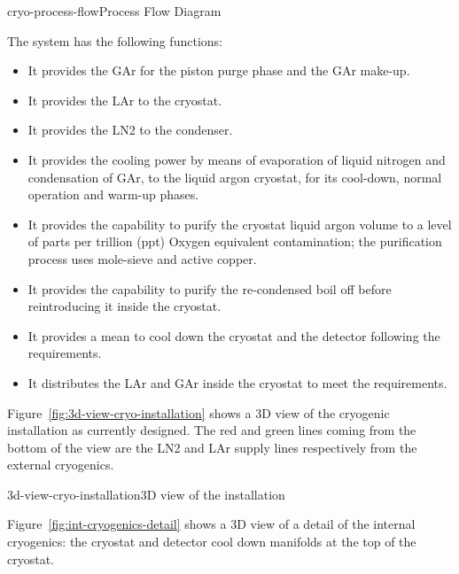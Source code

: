 \begin{cdrfigure}{cryo-process-flow}{Process Flow Diagram} 
\end{cdrfigure}

The system has the following functions:

\begin{itemize}
\item It provides the GAr for the piston purge phase and the GAr make-up.
\item  It provides the LAr to the cryostat.
\item  It provides the LN2 to the condenser.
\item  It provides the cooling power by means of evaporation of liquid nitrogen and condensation of GAr, to the liquid argon cryostat, for its cool-down, normal operation and warm-up phases.
\item  It provides the capability to purify the cryostat liquid argon volume to a level of parts per trillion (ppt) Oxygen equivalent contamination; the purification process uses mole-sieve and active copper.
\item  It provides the capability to purify the re-condensed boil off before reintroducing it inside the cryostat.
\item  It provides a mean to cool down the cryostat and the detector following the requirements.
\item  It distributes the LAr and GAr inside the cryostat to meet the requirements.
\end{itemize}

Figure~\ref{fig:3d-view-cryo-installation} shows a 3D view of the cryogenic installation as currently designed. The red and green lines coming from the bottom of the view are the LN2 and LAr supply lines respectively from the external cryogenics.

\begin{cdrfigure}{3d-view-cryo-installation}{3D view of the installation } 
\end{cdrfigure}

Figure~\ref{fig:int-cryogenics-detail} shows a 3D view of a detail of the internal cryogenics: the cryostat and detector cool down manifolds at the top of the cryostat.

